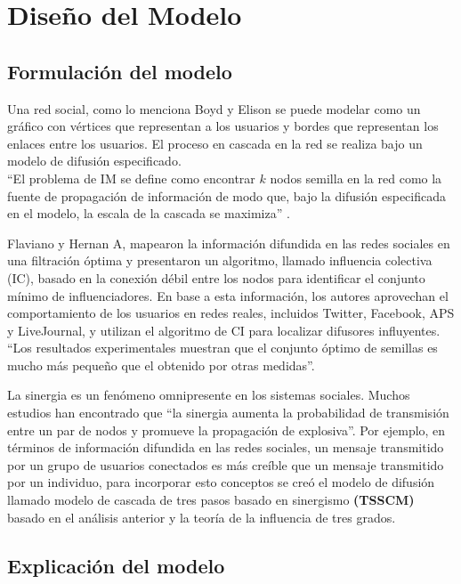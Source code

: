 \documentclass{article}
\begin{document}
\section{Diseño del Modelo}
 
 \subsection{Formulación del modelo}
  Una red social, como lo menciona Boyd y Elison se puede modelar como un gráfico con vértices que representan a los usuarios y bordes que representan los enlaces entre los usuarios. El proceso en cascada en la red se realiza bajo un modelo de difusión especificado.\\
 “El problema de IM se define como encontrar $k$ nodos semilla en la red como la fuente de  propagación de información de modo que, bajo la difusión especificada en el modelo, la escala  de la cascada se maximiza” \cite{cite:problemaIM}.
 
 Flaviano y Hernan A, mapearon la información difundida en las redes sociales en una  filtración óptima y presentaron un algoritmo, llamado influencia colectiva (IC), basado en la  conexión débil entre los nodos para identificar el conjunto mínimo de influenciadores. En base a  esta información, los autores aprovechan el comportamiento de los usuarios en redes reales,  incluidos Twitter, Facebook, APS y LiveJournal, y utilizan el algoritmo de CI para localizar  difusores influyentes. “Los resultados experimentales muestran que el conjunto óptimo de semillas es mucho más pequeño que el obtenido por otras medidas”\cite{cite:semillas}.
 
 La sinergia es un fenómeno omnipresente en los sistemas sociales. Muchos estudios han encontrado que “la sinergia aumenta la probabilidad de transmisión entre un par de nodos y promueve la propagación de explosiva”\cite{cite:sinergia}. Por ejemplo, en términos de información difundida en las redes sociales, un mensaje transmitido por un grupo de usuarios conectados es más creíble que un mensaje transmitido por un individuo, para incorporar esto conceptos se creó el modelo de difusión llamado modelo de cascada de tres pasos basado en sinergismo \textbf{(TSSCM)} basado en el análisis anterior y la teoría de la influencia de tres grados.
 
\subsection{Explicación del modelo}
\end{document}
